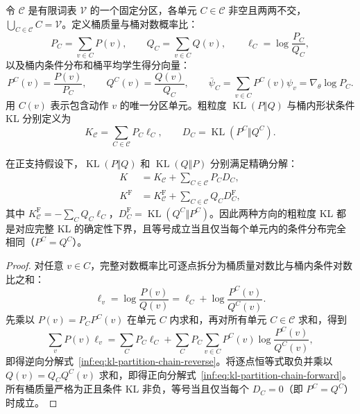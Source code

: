\documentclass[lang=cn,scheme=chinese,openany]{elegantbook}
\newcommand{\KL}{\operatorname{KL}}
\begin{document}
\begin{definition}[词表分区与桶内条件分布]
令 $\mathcal C$ 是有限词表 $\mathcal V$ 的一个固定分区，各单元 $C\in\mathcal C$ 非空且两两不交，$\bigcup_{C\in\mathcal C}C=\mathcal V$。定义桶质量与桶对数概率比：
\begin{equation*}
 P_C=\sum_{v\in C}P(v),\qquad
 Q_C=\sum_{v\in C}Q(v),\qquad
 \ell_C=\log\frac{P_C}{Q_C},
\end{equation*}
以及桶内条件分布和桶平均学生得分向量：
\begin{equation*}
 P^C(v)=\frac{P(v)}{P_C},\qquad
 Q^C(v)=\frac{Q(v)}{Q_C},\qquad
 \bar \psi_C=\sum_{v\in C}P^C(v)\psi_v=\nabla_\theta\log P_C.
\end{equation*}
用 $C(v)$ 表示包含动作 $v$ 的唯一分区单元。粗粒度 $\KL(P\Vert Q)$ 与桶内形状条件 KL 分别定义为
\begin{equation*}
 K_{\mathcal C}=\sum_{C\in\mathcal C}P_C\ell_C,
 \qquad D_C=\KL(P^C\Vert Q^C).
\end{equation*}
\end{definition}

\begin{theorem}
\label{inf:thm:kl-partition-chain}
在正支持假设下，$\KL(P\Vert Q)$ 和 $\KL(Q\Vert P)$ 分别满足精确分解：
\begin{align}
 K&=K_{\mathcal C}+\sum_{C\in\mathcal C}P_C D_C,
 \label{inf:eq:kl-partition-chain-reverse}\\
 K^{\mathrm F}&=K^{\mathrm F}_{\mathcal C}
       +\sum_{C\in\mathcal C}Q_C D^{\mathrm F}_C,
 \label{inf:eq:kl-partition-chain-forward}
\end{align}
其中 $K^{\mathrm F}_{\mathcal C}=-\sum_C Q_C\ell_C$，$D_C^{\mathrm F}=\KL(Q^C\Vert P^C)$。因此两种方向的粗粒度 KL 都是对应完整 KL 的确定性下界，且等号成立当且仅当每个单元内的条件分布完全相同（$P^C=Q^C$）。
\end{theorem}
\begin{proof}
对任意 $v\in C$，完整对数概率比可逐点拆分为桶质量对数比与桶内条件对数比之和：
\begin{equation*}
 \ell_v=\log\frac{P(v)}{Q(v)}
     =\ell_C+\log\frac{P^C(v)}{Q^C(v)}.
\end{equation*}
先乘以 $P(v)=P_C P^C(v)$ 在单元 $C$ 内求和，再对所有单元 $C\in\mathcal C$ 求和，得到
\begin{equation*}
 \sum_v P(v)\ell_v
 =\sum_C P_C\ell_C
  +\sum_C P_C\sum_{v\in C}P^C(v)
                        \log\frac{P^C(v)}{Q^C(v)},
\end{equation*}
即得逆向分解式~\eqref{inf:eq:kl-partition-chain-reverse}。将逐点恒等式取负并乘以 $Q(v)=Q_C Q^C(v)$ 求和，即得正向分解式~\eqref{inf:eq:kl-partition-chain-forward}。所有桶质量严格为正且条件 KL 非负，等号当且仅当每个 $D_C=0$（即 $P^C=Q^C$）时成立。
\end{proof}
\end{document}

